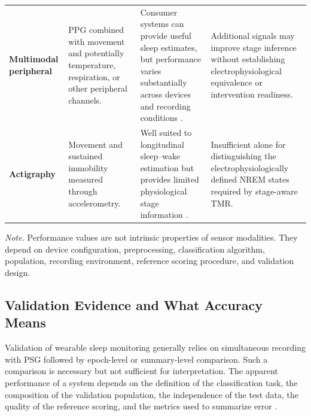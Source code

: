 \begin{table}[t]
\begin{tabularx}{\textwidth}{
@{}
>{\raggedright\arraybackslash}p{2.1cm}
>{\raggedright\arraybackslash}X
>{\raggedright\arraybackslash}X
>{\raggedright\arraybackslash}X
@{}
}
\addlinespace[1.2mm]

\textbf{Multimodal peripheral}
&
PPG combined with movement and potentially temperature, respiration, or other
peripheral channels.
&
Consumer systems can provide useful sleep estimates, but performance varies
substantially across devices and recording conditions
\citep{chinoy2021consumer,svensson2024oura}.
&
Additional signals may improve stage inference without establishing
electrophysiological equivalence or intervention readiness.
\\

\addlinespace[1.2mm]

\textbf{Actigraphy}
&
Movement and sustained immobility measured through accelerometry.
&
Well suited to longitudinal sleep--wake estimation but provides limited
physiological stage information \citep{dezambotti2019wearable}.
&
Insufficient alone for distinguishing the electrophysiologically defined NREM
states required by stage-aware TMR.
\\

\bottomrule

\end{tabularx}

\vspace{1mm}

\begin{minipage}{\textwidth}
\footnotesize
\textit{Note.}
Performance values are not intrinsic properties of sensor modalities.
They depend on device configuration, preprocessing, classification algorithm,
population, recording environment, reference scoring procedure, and validation
design.
\end{minipage}

\end{table}


\subsection{Validation Evidence and What Accuracy Means}

Validation of wearable sleep monitoring generally relies on simultaneous
recording with PSG followed by epoch-level or summary-level comparison. Such a
comparison is necessary but not sufficient for interpretation. The apparent
performance of a system depends on the definition of the classification task,
the composition of the validation population, the independence of the test
data, the quality of the reference scoring, and the metrics used to summarize
error \citep{dezambotti2019wearable}.

